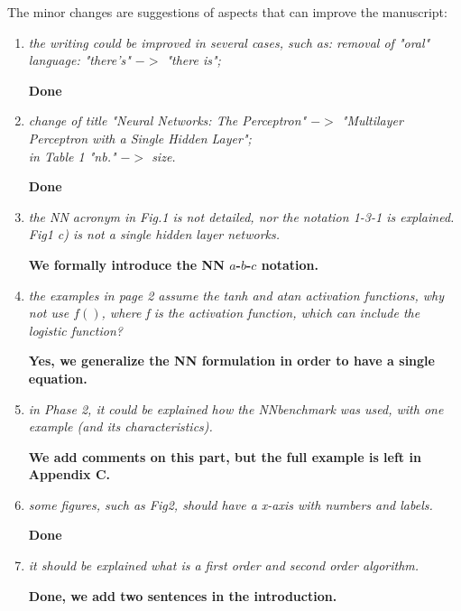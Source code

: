 \documentclass[12pt]{article}
\begin{document}
The minor changes are suggestions of aspects that can improve the manuscript:
\begin{enumerate}
\item \textit{the writing could be improved in several cases, such as: removal of "oral" language: "there’s" $->$ "there is";}

\textbf{Done}


\item \textit{change of title "Neural Networks: The Perceptron" $->$ "Multilayer Perceptron with a Single Hidden Layer";\\
 in Table 1 "nb." $->$ size.}
 
 \textbf{Done}

\item \textit{the NN acronym in Fig.1 is not detailed, nor the notation 1-3-1 is explained.\\ 
Fig1 c) is not a single hidden layer networks.}

\textbf{We formally introduce the NN $a$-$b$-$c$ notation.}


\item \textit{the examples in page 2 assume the tanh and atan activation functions, why not use $f()$, where f is the activation function, which can include the logistic function?}

\textbf{Yes, we generalize the NN formulation in order to have a single equation.}


\item \textit{in Phase 2, it could be explained how the NNbenchmark was used, with one example (and its characteristics).}

\textbf{We add comments on this part, but the full example is left in Appendix C.}


\item \textit{some figures, such as Fig2, should have a x-axis with numbers and labels.}

\textbf{Done}


\item \textit{it should be explained what is a first order and second order algorithm.}

\textbf{Done, we add two sentences in the introduction.}


\end{enumerate}

  
\end{document}

